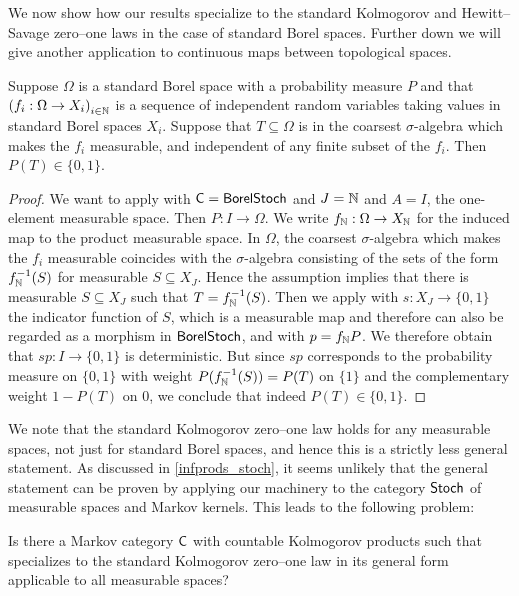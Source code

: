 \documentclass[11pt]{article}
\begin{document}
We now show how our results specialize to the standard Kolmogorov and Hewitt--Savage zero--one laws in the case of standard Borel spaces. Further down we will give another application to continuous maps between topological spaces.

\begin{corollary}
	Suppose $\Omega$ is a standard Borel space with a probability measure $P$ and that $\left(f_i: \Omega \to X_i\right)_{i \in \mathbb{N}}$ is a sequence of independent random variables taking values in standard Borel spaces $X_i$. Suppose that $T \subseteq \Omega$ is in the coarsest $\sigma$-algebra which makes the $f_i$ measurable, and independent of any finite subset of the $f_i$. Then $P(T) \in \{0,1\}$.
\end{corollary}
\begin{proof}
	We want to apply  with $\mathsf{C} = \operatorname{\mathsf{BorelStoch}}$ and $J = \mathbb{N}$ and $A = I$, the one-element measurable space. Then $P : I \to \Omega$. We write $f_{\mathbb{N}} : \Omega \to X_{\mathbb{N}}$ for the induced map to the product measurable space. In $\Omega$, the coarsest $\sigma$-algebra which makes the $f_i$ measurable coincides with the $\sigma$-algebra consisting of the sets of the form $f_{\mathbb{N}}^{-1}(S)$ for measurable $S \subseteq X_J$. Hence the assumption implies that there is measurable $S \subseteq X_J$ such that $T = f_{\mathbb{N}}^{-1}(S)$. Then we apply  with $s : X_J \to \{0,1\}$ the indicator function of $S$, which is a measurable map and therefore can also be regarded as a morphism in $\operatorname{\mathsf{BorelStoch}}$, and with $p = f_{\mathbb{N}} P$. We therefore obtain that $sp : I \to \{0,1\}$ is deterministic. But since $sp$ corresponds to the probability measure on $\{0,1\}$ with weight $P(f_{\mathbb{N}}^{-1}(S)) = P(T)$ on $\{1\}$ and the complementary weight $1 - P(T)$ on $0$, we conclude that indeed $P(T) \in \{0,1\}$.
\end{proof}

We note that the standard Kolmogorov zero--one law holds for any measurable
spaces, not just for standard Borel spaces, and hence this is a strictly less
general statement. As discussed in \cref{infprods_stoch}, it seems unlikely that
the general statement can be proven by applying our machinery to the category
$\operatorname{\mathsf{Stoch}}$ of measurable spaces and Markov kernels. This leads to the following problem:

\begin{problem}
	Is there a Markov category $\mathsf{C}$ with countable Kolmogorov products such that  specializes to the standard Kolmogorov zero--one law in its general form applicable to all measurable spaces?
  \end{problem}
\end{document}
